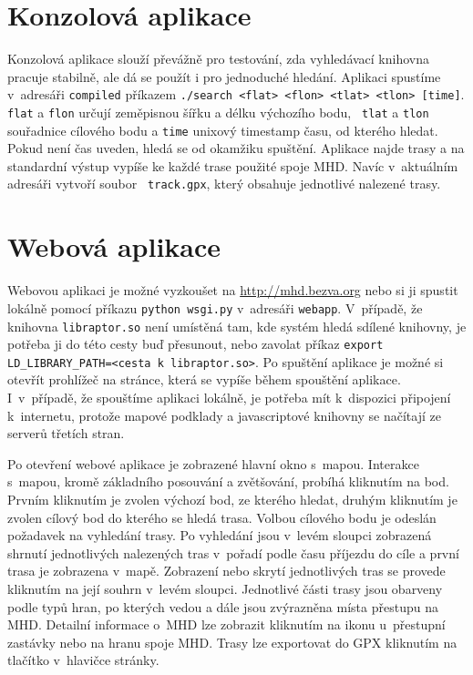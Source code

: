 \section{Konzolová aplikace}
Konzolová aplikace slouží převážně pro testování, zda vyhledávací knihovna
pracuje stabilně, ale dá se použít i pro jednoduché hledání. Aplikaci spustíme
v~adresáři {\tt compiled} příkazem {\tt ./search <flat> <flon> <tlat> <tlon>
[time]}.\\ {\tt flat} a {\tt flon} určují zeměpisnou šířku a délku výchozího bodu, {\tt
tlat} a {\tt tlon} souřadnice cílového bodu a {\tt time} unixový timestamp času,
od kterého hledat. Pokud není čas uveden, hledá se od
okamžiku spuštění.  Aplikace najde trasy a na standardní výstup vypíše ke každé
trase použité spoje MHD. Navíc v~aktuálním adresáři vytvoří soubor {\tt
track.gpx}, který obsahuje jednotlivé nalezené trasy.
 
\section{Webová aplikace}
Webovou aplikaci je možné vyzkoušet na \url{http://mhd.bezva.org} nebo si ji spustit lokálně
pomocí příkazu {\tt python wsgi.py} v~adresáři {\tt webapp}. V~případě, že knihovna
{\tt libraptor.so} není umístěná tam, kde systém hledá sdílené knihovny, je potřeba ji
do této cesty buď přesunout, nebo zavolat příkaz {\tt export
LD\_LIBRARY\_PATH=<cesta k~libraptor.so>}. Po spuštění aplikace je možné si
otevřít prohlížeč na stránce, která se vypíše během spouštění aplikace.
I~v~případě, že spouštíme aplikaci lokálně, je potřeba mít k~dispozici připojení
k~internetu, protože mapové podklady a javascriptové knihovny se načítají ze
serverů třetích stran.

Po otevření webové aplikace je zobrazené hlavní okno s~mapou. Interakce s~mapou,
kromě základního posouvání a zvětšování, probíhá kliknutím na bod. Prvním
kliknutím je zvolen výchozí bod, ze kterého hledat, druhým kliknutím je zvolen
cílový bod do kterého se hledá trasa. Volbou cílového bodu je odeslán požadavek
na vyhledání trasy. Po vyhledání jsou v~levém sloupci zobrazená shrnutí
jednotlivých nalezených tras v~pořadí podle času příjezdu do cíle a první trasa
je zobrazena v~mapě. Zobrazení nebo skrytí jednotlivých tras se provede
kliknutím na její souhrn v~levém sloupci. Jednotlivé části trasy jsou obarveny
podle typů hran, po kterých vedou a dále jsou zvýrazněna místa přestupu na MHD.
Detailní informace o~MHD lze zobrazit kliknutím na ikonu u~přestupní zastávky
nebo na hranu spoje MHD. Trasy lze exportovat do GPX kliknutím na tlačítko
 v~hlavičce stránky.

